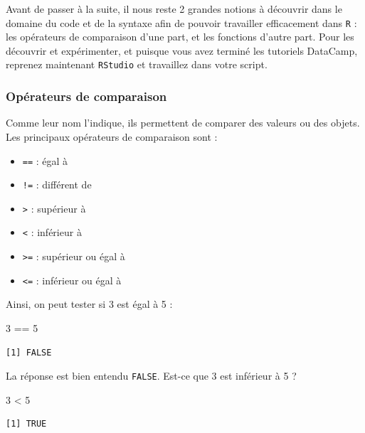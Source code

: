 \documentclass[
  letterpaper,
  DIV=11,
  numbers=noendperiod]{scrreprt}
\newenvironment{Shaded}{\begin{snugshade}}{\end{snugshade}}
\newcommand{\DecValTok}[1]{\textcolor[rgb]{0.68,0.00,0.00}{#1}}
\newcommand{\SpecialCharTok}[1]{\textcolor[rgb]{0.37,0.37,0.37}{#1}}
\providecommand{\tightlist}{%
  \setlength{\itemsep}{0pt}\setlength{\parskip}{0pt}}\usepackage{longtable,booktabs,array}
\begin{document}
Avant de passer à la suite, il nous reste 2 grandes notions à découvrir
dans le domaine du code et de la syntaxe afin de pouvoir travailler
efficacement dans \texttt{R} : les opérateurs de comparaison d'une part,
et les fonctions d'autre part. Pour les découvrir et expérimenter, et
puisque vous avez terminé les tutoriels DataCamp, reprenez maintenant
\texttt{RStudio} et travaillez dans votre script.

\hypertarget{sec-comparaison}{%
\subsubsection{Opérateurs de comparaison}\label{sec-comparaison}}

Comme leur nom l'indique, ils permettent de comparer des valeurs ou des
objets. Les principaux opérateurs de comparaison sont :

\begin{itemize}
\tightlist
\item
  \texttt{==} : égal à
\item
  \texttt{!=} : différent de
\item
  \texttt{\textgreater{}} : supérieur à
\item
  \texttt{\textless{}} : inférieur à
\item
  \texttt{\textgreater{}=} : supérieur ou égal à
\item
  \texttt{\textless{}=} : inférieur ou égal à
\end{itemize}

Ainsi, on peut tester si 3 est égal à 5 :

\begin{Shaded}
\begin{Highlighting}[]
\DecValTok{3} \SpecialCharTok{==} \DecValTok{5}
\end{Highlighting}
\end{Shaded}

\begin{verbatim}
[1] FALSE
\end{verbatim}

La réponse est bien entendu \texttt{FALSE}. Est-ce que 3 est inférieur à
5 ?

\begin{Shaded}
\begin{Highlighting}[]
\DecValTok{3} \SpecialCharTok{\textless{}} \DecValTok{5}
\end{Highlighting}
\end{Shaded}

\begin{verbatim}
[1] TRUE
\end{verbatim}
\end{document}
